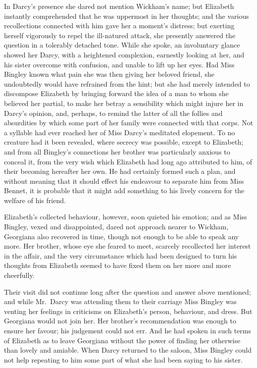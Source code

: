 In Darcy's presence she dared not mention Wickham's name;
but Elizabeth instantly comprehended that he was uppermost in
her thoughts; and the various recollections connected with him
gave her a moment's distress; but exerting herself vigorously to
repel the ill-natured attack, she presently answered the question
in a tolerably detached tone.  While she spoke, an involuntary
glance showed her Darcy, with a heightened complexion,
earnestly looking at her, and his sister overcome with confusion,
and unable to lift up her eyes.  Had Miss Bingley known what
pain she was then giving her beloved friend, she undoubtedly
would have refrained from the hint; but she had merely intended
to discompose Elizabeth by bringing forward the idea of a man
to whom she believed her partial, to make her betray a sensibility
which might injure her in Darcy's opinion, and, perhaps, to
remind the latter of all the follies and absurdities by which
some part of her family were connected with that corps.  Not a
syllable had ever reached her of Miss Darcy's meditated
elopement.  To no creature had it been revealed, where secrecy
was possible, except to Elizabeth; and from all Bingley's
connections her brother was particularly anxious to conceal it,
from the very wish which Elizabeth had long ago attributed to
him, of their becoming hereafter her own.  He had certainly
formed such a plan, and without meaning that it should effect
his endeavour to separate him from Miss Bennet, it is probable
that it might add something to his lively concern for the welfare
of his friend.

Elizabeth's collected behaviour, however, soon quieted his
emotion; and as Miss Bingley, vexed and disappointed, dared
not approach nearer to Wickham, Georgiana also recovered in
time, though not enough to be able to speak any more.  Her
brother, whose eye she feared to meet, scarcely recollected her
interest in the affair, and the very circumstance which had
been designed to turn his thoughts from Elizabeth seemed to
have fixed them on her more and more cheerfully.

Their visit did not continue long after the question and answer
above mentioned; and while Mr.\ Darcy was attending them to
their carriage Miss Bingley was venting her feelings in criticisms
on Elizabeth's person, behaviour, and dress.  But Georgiana
would not join her.  Her brother's recommendation was enough
to ensure her favour; his judgement could not err.  And he had
spoken in such terms of Elizabeth as to leave Georgiana without
the power of finding her otherwise than lovely and amiable.
When Darcy returned to the saloon, Miss Bingley could not help
repeating to him some part of what she had been saying to his
sister.


